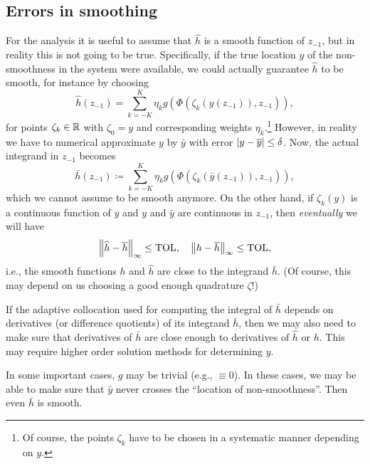 \documentclass[11pt]{article}
\begin{document}
\subsection{Errors in smoothing}
\label{sec:errors-smoothing}

For the analysis it is useful to assume that $\hat{h}$ is a smooth function of
$z_{-1}$, but in reality this is not going to be true. Specifically, if the
true location $y$ of the non-smoothness in the system were available, we could
actually guarantee $\hat{h}$ to be smooth, for instance by choosing
\begin{equation*}
  \hat{h}(z_{-1}) = \sum_{k=-K}^{K} \eta_k g\left( \Phi\left( \zeta_k(y(z_{-1})),
      z_{-1} \right) \right),
\end{equation*}
for points $\zeta_k \in \mathbb{R}$ with $\zeta_0 = y$ and corresponding weights
$\eta_k$.\footnote{Of course, the points $\zeta_k$ have to be chosen in a
  systematic manner depending on $y$.} However, in reality we have to
numerical approximate $y$ by $\bar{y}$ with error
$\left\lvert y - \overline{y}\right\rvert \le \delta$. Now, the actual integrand in $z_{-1}$ becomes 
\begin{equation*}
  \bar{h}(z_{-1}) \coloneqq \sum_{k=-K}^{K} \eta_k g\left( \Phi\left( \zeta_k(
      \bar{y}(z_{-1})), z_{-1} \right) \right),
\end{equation*}
which we cannot assume to be smooth anymore. On the other hand, if
$\zeta_k(y)$ is a continuous function of $y$ and $y$ and $\bar{y}$ are continuous
in $z_{-1}$, then \emph{eventually} we will have
\begin{equation*}
  \left\lVert\widehat{h} - \overline{h}\right\rVert_\infty \le \mathrm{TOL}, \quad \left\lVert h - \overline{h}\right\rVert_\infty
  \le \mathrm{TOL}, 
\end{equation*}
i.e., the smooth functions $h$ and $\hat{h}$ are close to the integrand
$\bar{h}$. (Of course, this may depend on us choosing a good enough quadrature
$\zeta$!) 
\begin{remark}
  If the adaptive collocation used for computing the integral of $\bar{h}$
  depends on derivatives (or difference quotients) of its integrand $\bar{h}$,
  then we may also need to make sure that derivatives of $\bar{h}$ are close
  enough to derivatives of $\hat{h}$ or $h$. This may require higher order
  solution methods for determining $y$.
\end{remark}
\begin{remark}
  In some important cases, $g$ may be trivial (e.g., $\equiv 0$). In these
  cases, we may be able to make sure that $\bar{y}$ never crosses the ``location of
  non-smoothness''. Then even $\bar{h}$ is smooth.
\end{remark}
\end{document}

